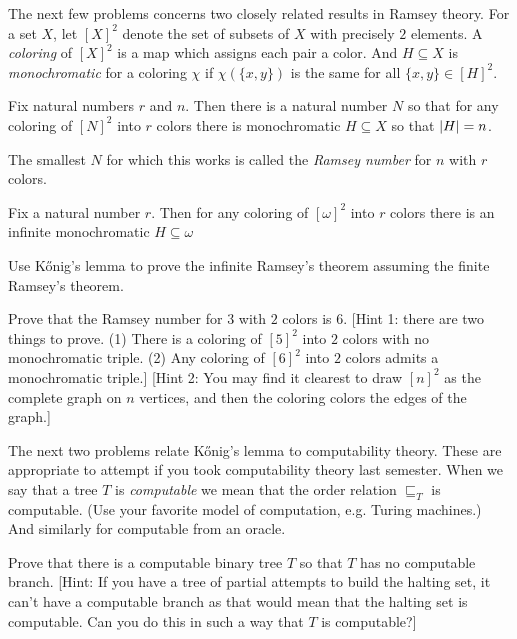 \documentclass[10pt]{amsart}
\begin{document}
The next few problems concerns two closely related results in Ramsey theory. For a set $X$, let $[X]^2$ denote the set of subsets of $X$ with precisely $2$ elements. A \emph{coloring} of $[X]^2$ is a map which assigns each pair a color. And $H \subseteq X$ is \emph{monochromatic} for a coloring $\chi$ if $\chi(\{x,y\})$ is the same for all $\{x,y\} \in [H]^2$.

\begin{theorem*}
Fix natural numbers $r$ and $n$. Then there is a natural number $N$ so that for any coloring of $[N]^2$ into $r$ colors there is monochromatic $H \subseteq X$ so that $\left\lvert H \right\rvert = n$.
\end{theorem*}

The smallest $N$ for which this works is called the \emph{Ramsey number} for $n$ with $r$ colors.

\begin{theorem*}
Fix a natural number $r$. Then for any coloring of $[\omega]^2$ into $r$ colors there is an infinite monochromatic $H \subseteq \omega$
\end{theorem*}

\begin{problem}
Use K\H{o}nig's lemma to prove the infinite Ramsey's theorem assuming the finite Ramsey's theorem.
\end{problem}


\begin{problem}
Prove that the Ramsey number for $3$ with $2$ colors is $6$. [Hint 1: there are two things to prove. (1) There is a coloring of $[5]^2$ into $2$ colors with no monochromatic triple. (2) Any coloring of $[6]^2$ into $2$ colors admits a monochromatic triple.] [Hint 2: You may find it clearest to draw $[n]^2$ as the complete graph on $n$ vertices, and then the coloring colors the edges of the graph.]
\end{problem}

The next two problems relate K\H{o}nig's lemma to computability theory. These are appropriate to attempt if you took computability theory last semester. When we say that a tree $T$ is \emph{computable} we mean that the order relation $\sqsubseteq_T$ is computable. (Use your favorite model of computation, e.g. Turing machines.) And similarly for computable from an oracle.

\begin{problem}
Prove that there is a computable binary tree $T$ so that $T$ has no computable branch. [Hint: If you have a tree of partial attempts to build the halting set, it can't have a computable branch as that would mean that the halting set is computable. Can you do this in such a way that $T$ is computable?]
\end{problem}
\end{document}
